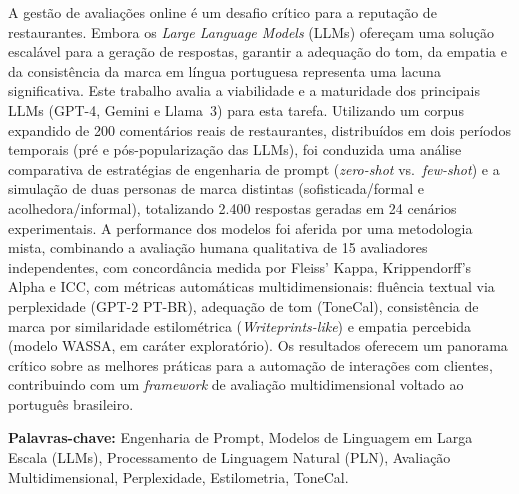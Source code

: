 %



\begin{resumo}
A gestão de avaliações online é um desafio crítico para a reputação de restaurantes. Embora os \textit{Large Language Models} (LLMs) ofereçam uma solução escalável para a geração de respostas, garantir a adequação do tom, da empatia e da consistência da marca em língua portuguesa representa uma lacuna significativa. Este trabalho avalia a viabilidade e a maturidade dos principais LLMs (GPT-4, Gemini e Llama~3) para esta tarefa. Utilizando um corpus expandido de 200 comentários reais de restaurantes, distribuídos em dois períodos temporais (pré e pós-popularização das LLMs), foi conduzida uma análise comparativa de estratégias de engenharia de prompt (\textit{zero-shot} vs.\ \textit{few-shot}) e a simulação de duas personas de marca distintas (sofisticada/formal e acolhedora/informal), totalizando 2.400 respostas geradas em 24 cenários experimentais. A performance dos modelos foi aferida por uma metodologia mista, combinando a avaliação humana qualitativa de 15 avaliadores independentes, com concordância medida por Fleiss' Kappa, Krippendorff's Alpha e ICC, com métricas automáticas multidimensionais: fluência textual via perplexidade (GPT-2 PT-BR), adequação de tom (ToneCal), consistência de marca por similaridade estilométrica (\textit{Writeprints-like}) e empatia percebida (modelo WASSA, em caráter exploratório). Os resultados oferecem um panorama crítico sobre as melhores práticas para a automação de interações com clientes, contribuindo com um \textit{framework} de avaliação multidimensional voltado ao português brasileiro.

\textbf{Palavras-chave:} Engenharia de Prompt, Modelos de Linguagem em Larga Escala (LLMs), Processamento de Linguagem Natural (PLN), Avaliação Multidimensional, Perplexidade, Estilometria, ToneCal.
\end{resumo}


